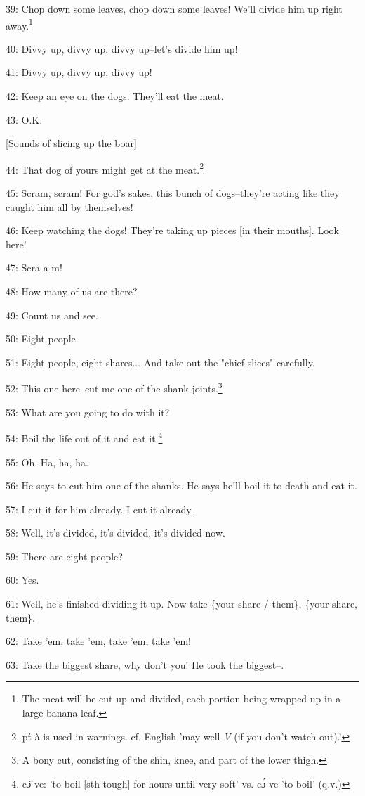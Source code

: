39: Chop down some leaves, chop down some leaves! We'll divide him up right away.\footnote{The meat will be cut up and divided, each portion being wrapped up in a large banana-leaf.}

40: Divvy up, divvy up, divvy up--let's divide him up!

41: Divvy up, divvy up, divvy up!

42: Keep an eye on the dogs. They'll eat the meat.

43: O.K.

[Sounds of slicing up the boar]

44: That dog of yours might get at the meat.\footnote{pt́ à is used in warnings. cf. English 'may well \emph{V} (if you don't watch out).'}

45: Scram, scram! For god's sakes, this bunch of dogs--they're acting like they
caught him all by themselves!

46: Keep watching the dogs! They're taking up pieces [in their mouths]. Look here!

47: Scra-a-m!

48: How many of us are there?

49: Count us and see.

50: Eight people.

51: Eight people, eight shares... And take out the "chief-slices"
carefully.

52: This one here--cut me one of the shank-joints.\footnote{A bony cut, consisting of the shin, knee, and part of the lower thigh.}

53: What are you going to do with it?

54: Boil the life out of it and eat it.\footnote{cɔ̂ ve: 'to boil [sth tough] for hours until very soft' vs. cɔ́ ve 'to boil' (q.v.)}

55: Oh. Ha, ha, ha.

56: He says to cut him one of the shanks. He says he'll boil it to death and eat
it.

57: I cut it for him already. I cut it already.

58: Well, it's divided, it's divided, it's divided now.

59: There are eight people?

60: Yes.

61: Well, he's finished dividing it up. Now take \{your share / them\}, \{your
share, them\}.

62: Take 'em, take 'em, take 'em, take 'em!

63: Take the biggest share, why don't you! He took the biggest--.

